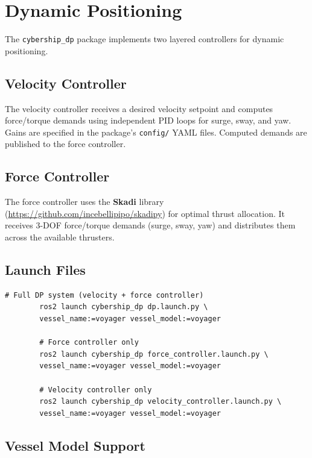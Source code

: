 \documentclass[12pt,a4paper]{article}
\begin{document}
	\section{Dynamic Positioning}
	\label{sec:dp}
	
	The \texttt{cybership\_dp} package implements two layered controllers for dynamic positioning.
	
	\subsection{Velocity Controller}
	
	The velocity controller receives a desired velocity setpoint and computes force/torque demands
	using independent PID loops for surge, sway, and yaw. Gains are specified in the package's
	\texttt{config/} YAML files. Computed demands are published to the force controller.
	
	\subsection{Force Controller}
	
	The force controller uses the \textbf{Skadi} library
	(\url{https://github.com/incebellipipo/skadipy}) for optimal thrust allocation. It receives
	3-DOF force/torque demands (surge, sway, yaw) and distributes them across the available
	thrusters.
	
	\subsection{Launch Files}
	
	\begin{lstlisting}[style=bash]
		# Full DP system (velocity + force controller)
		ros2 launch cybership_dp dp.launch.py \
		vessel_name:=voyager vessel_model:=voyager
		
		# Force controller only
		ros2 launch cybership_dp force_controller.launch.py \
		vessel_name:=voyager vessel_model:=voyager
		
		# Velocity controller only
		ros2 launch cybership_dp velocity_controller.launch.py \
		vessel_name:=voyager vessel_model:=voyager
	\end{lstlisting}
	
	\subsection{Vessel Model Support}
	
\end{document}

